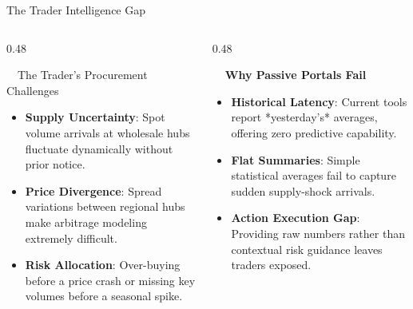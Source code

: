 \documentclass{beamer}
\begin{document}
\begin{frame}{The Trader Intelligence Gap}
\vspace{-0.2cm}

\begin{columns}[T]
    \begin{column}{0.48\textwidth}
        \begin{infocard}{~~The Trader's Procurement Challenges}
            \fontsize{6.8pt}{8.5pt}\selectfont
            \begin{itemize}\setlength\itemsep{4.5pt}\setlength\parskip{0pt}
                \item \textbf{Supply Uncertainty}: Spot volume arrivals at wholesale hubs fluctuate dynamically without prior notice.
                \item \textbf{Price Divergence}: Spread variations between regional hubs make arbitrage modeling extremely difficult.
                \item \textbf{Risk Allocation}: Over-buying before a price crash or missing key volumes before a seasonal spike.
            \end{itemize}
        \end{infocard}
    \end{column}
    
    \begin{column}{0.48\textwidth}
        \begin{smallcard}[0.98\textwidth, top=3pt, bottom=3pt, left=4pt, right=4pt, boxsep=0.5pt]
            \centering \textbf{\textcolor{primaryDark}{\small {}~~Why Passive Portals Fail}}
            \vspace{0.08cm}
            \fontsize{6.8pt}{8.2pt}\selectfont
            \begin{itemize}\setlength\itemsep{4.5pt}\setlength\parskip{0pt}
                \item \textbf{Historical Latency}: Current tools report *yesterday's* averages, offering zero predictive capability.
                \item \textbf{Flat Summaries}: Simple statistical averages fail to capture sudden supply-shock arrivals.
                \item \textbf{Action Execution Gap}: Providing raw numbers rather than contextual risk guidance leaves traders exposed.
            \end{itemize}
        \end{smallcard}
    \end{column}
\end{columns}


\end{frame}
\end{document}
